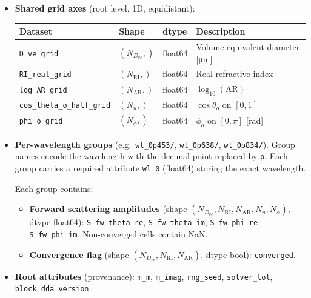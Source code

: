 \documentclass[11pt,a4paper]{article}
\begin{document}
\begin{itemize}
  \item \textbf{Shared grid axes} (root level, 1D, equidistant):

    \begin{tabular}{@{}llll@{}}
      \toprule
      Dataset & Shape & dtype & Description \\
      \midrule
      \texttt{D\_ve\_grid} & $(N_{D_{ve}},)$ & float64 &
        Volume-equivalent diameter [\si{\micro\metre}] \\
      \texttt{RI\_real\_grid} & $(N_{\mathrm{RI}},)$ & float64 &
        Real refractive index \\
      \texttt{log\_AR\_grid} & $(N_{\mathrm{AR}},)$ & float64 &
        $\log_{10}(\mathrm{AR})$ \\
      \texttt{cos\_theta\_o\_half\_grid} & $(N_u,)$ & float64 &
        $\cos\theta_o$ on $[0,1]$ \\
      \texttt{phi\_o\_grid} & $(N_\phi,)$ & float64 &
        $\phi_o$ on $[0,\pi]$ [rad] \\
      \bottomrule
    \end{tabular}

  \item \textbf{Per-wavelength groups}
        (e.g.\ \texttt{wl\_0p453/}, \texttt{wl\_0p638/},
        \texttt{wl\_0p834/}).
    Group names encode the wavelength with the decimal point replaced by
    \texttt{p}.  Each group carries a required attribute \texttt{wl\_0}
    (float64) storing the exact wavelength.

    Each group contains:
    \begin{itemize}
      \item \textbf{Forward scattering amplitudes}
            (shape $(N_{D_{ve}}, N_{\mathrm{RI}}, N_{\mathrm{AR}},
                     N_u, N_\phi)$, dtype float64):
        \texttt{S\_fw\_theta\_re}, \texttt{S\_fw\_theta\_im},
        \texttt{S\_fw\_phi\_re}, \texttt{S\_fw\_phi\_im}.
        Non-converged cells contain NaN.

      \item \textbf{Convergence flag}
            (shape $(N_{D_{ve}}, N_{\mathrm{RI}}, N_{\mathrm{AR}})$,
            dtype bool):
        \texttt{converged}.
    \end{itemize}

  \item \textbf{Root attributes} (provenance):
    \texttt{m\_m}, \texttt{m\_imag},
    \texttt{rng\_seed}, \texttt{solver\_tol},
    \texttt{block\_dda\_version}.
\end{itemize}
\end{document}
